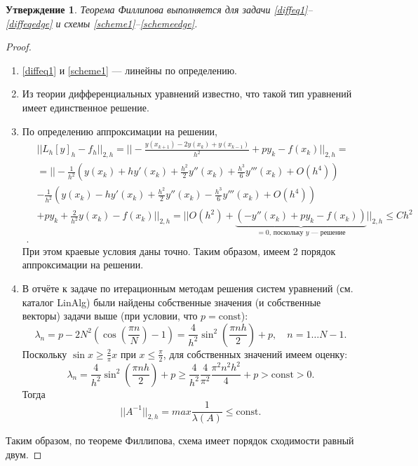\documentclass[14pt,a4paper]{extarticle}
\newtheorem{proposition}{Утверждение} %
\newcommand{\1}{\mathbbm{1}}
\begin{document}
\begin{proposition}
    Теорема Филлипова выполняется для задачи \eqref{diffeq1}--\eqref{diffeqedge} и схемы \eqref{scheme1}--\eqref{schemeedge}.
\end{proposition}
\begin{proof}
    \begin{enumerate}
        \item  \eqref{diffeq1} и \eqref{scheme1} --- линейны по определению.
        \item Из теории дифференциальных уравнений известно, что такой тип уравнений имеет единственное решение.
        \item По определению аппроксимации на решении,
        \begin{align*}
            & || L_h [y]_h - f_h || _{2, h} = || -\frac{y(x_{k+1}) - 2 y(x_k) + y(x_{k-1})}{h^2} + p y_k - f(x_k) || _{2, h} = \\ 
            & =|| -\frac{1}{h^2}\left(y(x_{k}) + h y'(x_{k}) + \frac{h^2}{2} y''(x_{k}) + \frac{h^3}{6} y'''(x_{k}) + O(h^4)\right)  \\
            & -\frac{1}{h^2}\left(y(x_{k}) - h y'(x_{k}) + \frac{h^2}{2} y''(x_{k}) - \frac{h^3}{6} y'''(x_{k}) + O(h^4)\right) \\ 
            & + p y_k + \frac{2}{h^2} y(x_k) - f(x_k) || _{2, h} = || O(h^2) + \underbrace{(- y''(x_{k}) + p y_k - f(x_k))}_{=0 \text{, поскольку $y$ --- решение}} ||_{2, h} \leq C h^2 \\ .           
        \end{align*}
        При этом краевые условия даны точно. Таким образом, имеем 2 порядок аппроксимации на решении.
        \item В отчёте к задаче по итерационным методам решения систем уравнений (см. каталог LinAlg) были найдены собственные значения 
        (и собственные векторы) задачи выше (при условии, что $p = \text{const}$): 
        \begin{equation*}
            \lambda_n = p - 2 N^2 (\cos(\frac{\pi n}{N}) - 1) = \frac{4}{h^2} \sin^2(\frac{\pi n h}{2}) + p, \quad n = 1 \ldots N - 1.
        \end{equation*}
        Поскольку $\sin x \geq \frac{2}{\pi} x $ при $x \leq \frac{\pi}{2}$, для собственных значений имеем оценку:
        \begin{equation*}
            \lambda_n = \frac{4}{h^2} \sin^2(\frac{\pi n h}{2}) + p \geq \frac{4}{h^2} \frac{4}{\pi ^2} \frac{\pi ^2 n^2 h^2}{4} + p > \text{const} > 0.
        \end{equation*}
        Тогда
        \begin{equation*}
            || A^{-1} ||_{2,h} = max \frac{1}{\lambda(A)} \leq \text{const}.
        \end{equation*}
    \end{enumerate}
    Таким образом, по теореме Филлипова, схема имеет порядок сходимости равный двум.
\end{proof}
\end{document}
